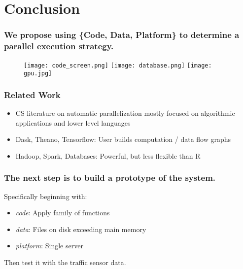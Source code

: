 \documentclass{beamer}
\begin{document}
\section{Conclusion}
\begin{frame}

    \frametitle{We propose using \{Code, Data, Platform\} to determine a
    parallel execution strategy.}


\begin{figure}
            \texttt{[image: code\_screen.png]}
            \hfill
            \texttt{[image: database.png]}
            \hfill
            \texttt{[image: gpu.jpg]}
\end{figure}

\end{frame}
\begin{frame}

    \frametitle{Related Work}


\begin{itemize}
    \item CS literature on automatic parallelization mostly focused on algorithmic applications
        and lower level languages
    \item Dask, Theano, Tensorflow: User builds computation / data flow graphs
    \item Hadoop, Spark, Databases: Powerful, but less flexible than R
\end{itemize}

\end{frame}
\begin{frame}

    \frametitle{The next step is to build a prototype of the system.}


    Specifically beginning with:

\begin{itemize}
    \item \emph{code}: Apply family of functions
    \item \emph{data}: Files on disk exceeding main memory
    \item \emph{platform}: Single server
\end{itemize}

Then test it with the traffic sensor data.

\end{frame}
\end{document}
